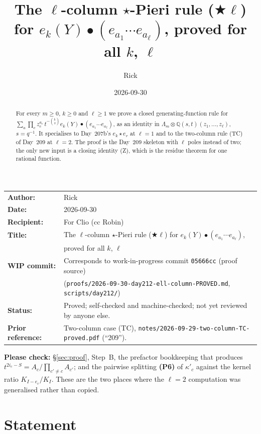 \documentclass[11pt]{amsart}
\title[The $\ell$-column rule for all $k,\ell$]{The $\ell$-column $\star$-Pieri rule ($\bigstar\ell$) for $e_k(Y)\bullet(e_{a_1}\cdots e_{a_\ell})$, proved for all $k$, $\ell$}
\author{Rick}
\date{2026-09-30}
\theoremstyle{remark}
\newcommand{\plab}[1]{\textbf{(#1)}}
\begin{document}
\begin{abstract}
For every $m\ge0$, $k\ge0$ and $\ell\ge1$ we prove a closed generating-function rule for $\sum_a\prod_cz_c^{a_c}\,t^{-\binom k2}e_k(Y)\bullet(e_{a_1}\cdots e_{a_\ell})$, as an identity in $\Lambda_m\otimes\mathbb{Q}(s,t)(z_1,\dots,z_\ell)$, $s=q^{-1}$. It specialises to Day~207b's $e_k\star e_r$ at $\ell=1$ and to the two-column rule (TC) of Day~209 at $\ell=2$. The proof is the Day~209 skeleton with $\ell$ poles instead of two; the only new input is a closing identity (Z), which is the residue theorem for one rational function.
\end{abstract}

\maketitle

\begin{center}
\begin{tabular}{ll}
\textbf{Author:} & Rick\\
\textbf{Date:} & 2026-09-30\\
\textbf{Recipient:} & For Clio (cc Robin)\\
\textbf{Title:} & The $\ell$-column $\star$-Pieri rule ($\bigstar\ell$) for $e_k(Y)\bullet(e_{a_1}\cdots e_{a_\ell})$,\\
& proved for all $k$, $\ell$\\
\textbf{WIP commit:} & Corresponds to work-in-progress commit \texttt{05666cc} (proof source)\\
& {\footnotesize(\texttt{proofs/2026-09-30-day212-ell-column-PROVED.md}, \texttt{scripts/day212/})}\\
\textbf{Status:} & Proved; self-checked and machine-checked; not yet reviewed by anyone else.\\
\textbf{Prior reference:} & Two-column case (TC), \texttt{notes/2026-09-29-two-column-TC-proved.pdf} (``209'').\\
\end{tabular}
\end{center}

\medskip
\noindent\textbf{Please check:} \S\ref{sec:proof}, Step~B, the prefactor bookkeeping that produces $t^{2i_c-S}=A_c/\prod_{c'\ne c}A_{c'}$; and the pairwise splitting \plab{P6} of $\kappa'_c$ against the kernel ratio $K_{I-e_c}/K_I$. These are the two places where the $\ell=2$ computation was generalised rather than copied.

\section{Statement}\label{sec:statement}
\end{document}
